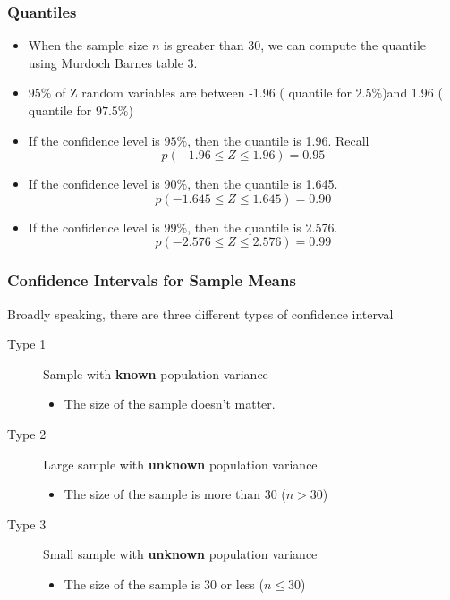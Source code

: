 \documentclass[a4]{beamer}
\begin{document}
\begin{frame}
\frametitle{Quantiles}

\begin{itemize} \item When the sample size $n$ is greater than 30, we can compute the quantile using Murdoch Barnes table 3.

\item $95\%$ of Z random variables are between -1.96 ( quantile for $2.5\%$)and 1.96 ( quantile for $97.5\%$)
\end{itemize}

\begin{itemize}
\item If the confidence level is $95\%$, then the quantile is 1.96. Recall
\[ p( -1.96 \leq Z \leq 1.96) = 0.95 \]

\item If the confidence level is $90\%$, then the quantile is 1.645.
\[ p( -1.645 \leq Z \leq 1.645) = 0.90 \]

\item If the confidence level is $99\%$, then the quantile is 2.576.
\[ p( -2.576 \leq Z \leq 2.576) = 0.99 \]

\end{itemize}



\end{frame}
\begin{frame}
\frametitle{Confidence Intervals for Sample Means}
Broadly speaking, there are three different types of confidence interval
\begin{description}
\item[Type 1] Sample with \textbf{known} population variance
\begin{itemize}
\item The size of the sample doesn't matter.
\end{itemize}
\item[Type 2] Large sample with \textbf{unknown} population variance
\begin{itemize}
\item The size of the sample is more than 30 ($n > 30$)
\end{itemize}
\item[Type 3] Small sample with \textbf{unknown} population variance
\begin{itemize}
\item The size of the sample is 30 or less ($n\leq 30$)
\end{itemize}
\end{description}
\end{frame}
\end{document}
